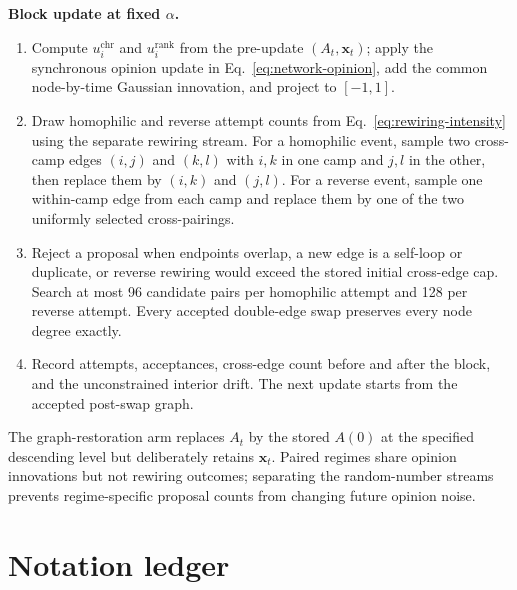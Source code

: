 \documentclass[10pt,a4paper]{article}
\newcommand{\inlinehead}[1]{\par\smallskip\noindent\textbf{#1}\ }
\begin{document}
\begin{appendices}
\inlinehead{Block update at fixed $\alpha$.}
\begin{enumerate}
  \item Compute $u_i^{\mathrm{chr}}$ and $u_i^{\mathrm{rank}}$ from the pre-update $(A_t,\bm x_t)$; apply the synchronous opinion update in Eq.~\eqref{eq:network-opinion}, add the common node-by-time Gaussian innovation, and project to $[-1,1]$.
  \item Draw homophilic and reverse attempt counts from Eq.~\eqref{eq:rewiring-intensity} using the separate rewiring stream. For a homophilic event, sample two cross-camp edges $(i,j)$ and $(k,l)$ with $i,k$ in one camp and $j,l$ in the other, then replace them by $(i,k)$ and $(j,l)$. For a reverse event, sample one within-camp edge from each camp and replace them by one of the two uniformly selected cross-pairings.
  \item Reject a proposal when endpoints overlap, a new edge is a self-loop or duplicate, or reverse rewiring would exceed the stored initial cross-edge cap. Search at most 96 candidate pairs per homophilic attempt and 128 per reverse attempt. Every accepted double-edge swap preserves every node degree exactly.
  \item Record attempts, acceptances, cross-edge count before and after the block, and the unconstrained interior drift. The next update starts from the accepted post-swap graph.
\end{enumerate}
The graph-restoration arm replaces $A_t$ by the stored $A(0)$ at the specified descending level but deliberately retains $\bm x_t$. Paired regimes share opinion innovations but not rewiring outcomes; separating the random-number streams prevents regime-specific proposal counts from changing future opinion noise.

\section{Notation ledger}


\end{appendices}
\end{document}
